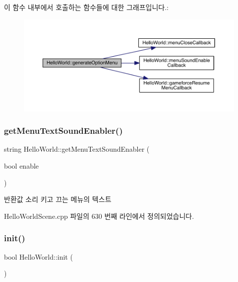 이 함수 내부에서 호출하는 함수들에 대한 그래프입니다.\+:
\nopagebreak
\begin{figure}[H]
\begin{center}
\leavevmode
\includegraphics[width=350pt]{class_hello_world_a24162678657656105f59887233f9c841_cgraph}
\end{center}
\end{figure}
\mbox{\label{class_hello_world_a85e65e13718aba32a3a35044f0f694c5}} 
\subsubsection{\texorpdfstring{get\+Menu\+Text\+Sound\+Enabler()}{getMenuTextSoundEnabler()}}
{\footnotesize\ttfamily string Hello\+World\+::get\+Menu\+Text\+Sound\+Enabler (\begin{DoxyParamCaption}\item[{bool}]{enable }\end{DoxyParamCaption})\hspace{0.3cm}{\ttfamily [protected]}}

\begin{DoxyReturn}{반환값}
소리 키고 끄는 메뉴의 텍스트 
\end{DoxyReturn}


Hello\+World\+Scene.\+cpp 파일의 630 번째 라인에서 정의되었습니다.

\mbox{\label{class_hello_world_a65e2b1525051f3690e5a39ca56608a97}} 
\subsubsection{\texorpdfstring{init()}{init()}}
{\footnotesize\ttfamily bool Hello\+World\+::init (\begin{DoxyParamCaption}{ }\end{DoxyParamCaption})\hspace{0.3cm}{\ttfamily [virtual]}}



